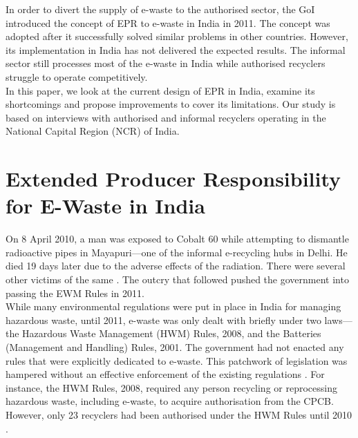 \documentclass[a4paper, 12pt]{article}
\begin{document}
                    In order to divert the supply of e-waste to the authorised sector, the GoI introduced the concept of EPR to e-waste in India in 2011. The concept was adopted after it successfully solved similar problems in other countries. However, its implementation in India has not delivered the expected results. The informal sector still processes most of the e-waste in India while authorised recyclers struggle to operate competitively. \\
                    
                    In this paper, we look at the current design of EPR in India, examine its shortcomings and propose improvements to cover its limitations. Our study is based on interviews with authorised and informal recyclers operating in the National Capital Region (NCR) of India.  
                    
\section{Extended Producer Responsibility for E-Waste in India}\label{sec:1}
                    
                    On 8 April 2010, a man was exposed to Cobalt 60 while attempting to dismantle radioactive pipes in Mayapuri—one of the informal e-recycling hubs in Delhi. He died 19 days later due to the adverse effects of the radiation. There were several other victims of the same \parencite{bhadurinews}. The outcry that followed pushed the government into passing the EWM Rules in 2011. \\
                    
                    While many environmental regulations were put in place in India for managing hazardous waste, until 2011, e-waste was only dealt with briefly under two laws—the Hazardous Waste Management (HWM) Rules, 2008, and the Batteries (Management and Handling) Rules, 2001. The government had not enacted any rules that were explicitly dedicated to e-waste. This patchwork of legislation was hampered without an effective enforcement of the existing regulations \parencite{kumarsinghpaper}. For instance, the HWM Rules, 2008, required any person recycling or reprocessing hazardous waste, including e-waste, to acquire authorisation from the CPCB. However, only 23 recyclers had been authorised under the HWM Rules until 2010 \parencite{bhaskarturagapapera}. \\
                    
\end{document}
